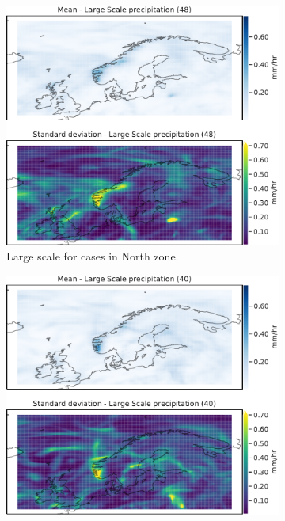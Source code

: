 \begin{figure}
\begin{subfigure}[b]{0.49\textwidth}
    \centering
    \includegraphics[width=\textwidth]{Figures/lsPNord.pdf}
    \caption{Large scale for cases in North zone.}
    \label{fig:NordlsP}
\end{subfigure}
\begin{subfigure}[b]{0.49\textwidth}
    \centering
    \includegraphics[width=\textwidth]{Figures/lsPNordvest.pdf}

\end{subfigure}
\end{figure}
